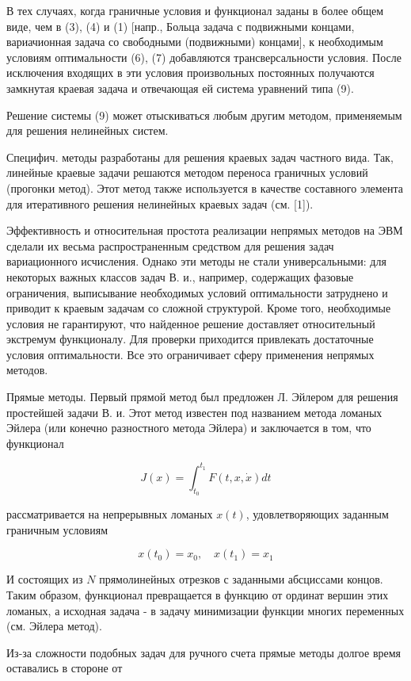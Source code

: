 \documentclass[10pt]{article}
\begin{document}
В тех случаях, когда граничные условия и функционал заданы в более общем виде, чем в (3), (4) и (1) [напр., Больца задача с подвижными концами, вариачионная задача со свободными (подвижными) концами], к необходимым условиям оптимальности (6), (7) добавляются трансверсальности условия. После исключения входящих в эти условия произвольных постоянных получаются замкнутая краевая задача и отвечающая ей система уравнений типа (9).



Решение системы (9) может отыскиваться любым другим методом, применяемым для решения нелинейных систем.



Специфич. методы разработаны для решения краевых задач частного вида. Так, линейные краевые задачи решаются методом переноса граничных условий (прогонки метод). Этот метод также используется в качестве составного элемента для итеративного решения нелинейных краевых задач (см. [1]).



Эффективность и относительная простота реализации непрямых методов на ЭВМ сделали их весьма распространенным средством для решения задач вариационного исчисления. Однако эти методы не стали универсальными: для некоторых важных классов задач В. и., например, содержащих фазовые ограничения, выписывание необходимых условий оптимальности затруднено и приводит к краевым задачам со сложной структурой. Кроме того, необходимые условия не гарантируют, что найденное решение доставляет относительный экстремум функционалу. Для проверки приходится привлекать достаточные условия оптимальности. Все это ограничивает сферу применения непрямых методов.



Прямые методы. Первый прямой метод был предложен Л. Эйлером для решения простейшей задачи В. и. Этот метод известен под названием метода ломаных Эйлера (или конечно разностного метода Эйлера) и заключается в том, что функционал



\[

J(x)=\int_{t_{0}}^{t_{1}} F(t, x, \dot{x}) d t

\]



рассматривается на непрерывных ломаных $x(t)$, удовлетворяющих заданным граничным условиям



\[

x\left(t_{0}\right)=x_{0}, \quad x\left(t_{1}\right)=x_{1}

\]



И состоящих из $N$ прямолинейных отрезков с заданными абсциссами концов. Таким образом, функционал превращается в функцию от ординат вершин этих ломаных, а исходная задача - в задачу минимизации функции многих переменных (см. Эйлера метод).



Из-за сложности подобных задач для ручного счета прямые методы долгое время оставались в стороне от
\end{document}
